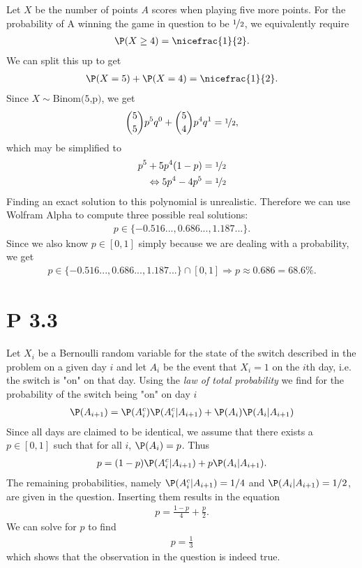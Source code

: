 \documentclass{article}
\begin{document}
Let $X$ be the number of points $A$ scores when playing five more points.
For the probability of A winning the game in question
to be $\nicefrac{1}{2}$, we equivalently require
\begin{align*}
	\P(X\geq 4) = \nicefrac{1}{2}.
\end{align*}
We can split this up to get
\begin{align*}
	\P(X = 5) + \P(X = 4) = \nicefrac{1}{2}.
\end{align*}
Since $X\sim\text{Binom(5,p)}$, we get
\begin{align*}
	\binom{5}{5}p^5q^0+\binom{5}{4}p^4q^1=\nicefrac{1}{2},
\end{align*}
which may be simplified to
\begin{align*}
	p^5+5p^4(1-p)             & = \nicefrac{1}{2} \\
	\Leftrightarrow 5p^4-4p^5 & =\nicefrac{1}{2}
\end{align*}
Finding an exact solution to this polynomial is unrealistic.
Therefore we can use Wolfram Alpha to compute three possible real solutions:
\begin{align*}
	p \in \{-0.516..., 0.686..., 1.187...\}.
\end{align*}
Since we also know $p\in[0,1]$ simply because we are dealing with a
probability, we get
\begin{align*}
	p\in \{-0.516..., 0.686..., 1.187...\} \cap [0,1] \Rightarrow p \approx 0.686=68.6\%.
\end{align*}


\section*{P 3.3}


Let $X_i$ be a Bernoulli random variable for the state of the switch described in the
problem on a given day $i$ and let $A_i$ be the event that $X_i=1$ on the $i$th day,
i.e. the switch is "on" on that day.
Using the \emph{law of total probability} we find for the probability of the switch
being "on" on day $i$
\begin{align*}
	\P(A_{i+1}) = \P(A^c_i)\P(A^c_i | A_{i+1}) + \P(A_i)\P(A_i|A_{i+1})
\end{align*}
Since all days are claimed to be
identical, we assume that there exists a $p\in[0,1]$ such that for all $i$,
$\P(A_i)=p$. Thus
\begin{align*}
	p = (1-p)\P(A^c_i|A_{i+1}) + p\P(A_i|A_{i+1}).
\end{align*}
The remaining probabilities, namely $\P(A^c_i|A_{i+1})=1/4$ and $\P(A_i|A_{i+1})=1/2$,
are given in the question. Inserting them results in the equation
\begin{align*}
	p=\frac{1-p}{4} + \frac{p}{2}.
\end{align*}
We can solve for $p$ to find
\begin{align*}
	p=\frac{1}{3}
\end{align*}
which shows that the observation in the question is indeed true.
\end{document}
